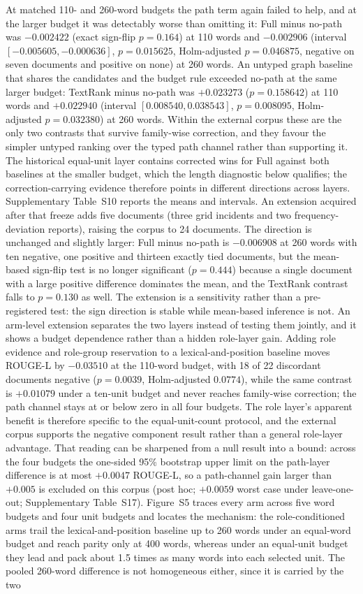 \documentclass[information,article,submit,moreauthors]{Definitions/mdpi}
\begin{document}
At matched 110- and 260-word budgets the path term again failed to help, and at the larger budget it was detectably worse than omitting it: Full minus no-path was $-0.002422$ (exact sign-flip $p=0.164$) at 110 words and $-0.002906$ (interval $[-0.005605,-0.000636]$, $p=0.015625$, Holm-adjusted $p=0.046875$, negative on seven documents and positive on none) at 260 words. An untyped graph baseline that shares the candidates and the budget rule exceeded no-path at the same larger budget: TextRank minus no-path was $+0.023273$ ($p=0.158642$) at 110 words and $+0.022940$ (interval $[0.008540,0.038543]$, $p=0.008095$, Holm-adjusted $p=0.032380$) at 260 words. Within the external corpus these are the only two contrasts that survive family-wise correction, and they favour the simpler untyped ranking over the typed path channel rather than supporting it. The historical equal-unit layer contains corrected wins for Full against both baselines at the smaller budget, which the length diagnostic below qualifies; the correction-carrying evidence therefore points in different directions across layers. Supplementary Table~S10 reports the means and intervals. An extension acquired after that freeze adds five documents (three grid incidents and two frequency-deviation reports), raising the corpus to 24 documents. The direction is unchanged and slightly larger: Full minus no-path is $-0.006908$ at 260 words with ten negative, one positive and thirteen exactly tied documents, but the mean-based sign-flip test is no longer significant ($p=0.444$) because a single document with a large positive difference dominates the mean, and the TextRank contrast falls to $p=0.130$ as well. The extension is a sensitivity rather than a pre-registered test: the sign direction is stable while mean-based inference is not. An arm-level extension separates the two layers instead of testing them jointly, and it shows a budget dependence rather than a hidden role-layer gain. Adding role evidence and role-group reservation to a lexical-and-position baseline moves ROUGE-L by $-0.03510$ at the 110-word budget, with 18 of 22 discordant documents negative ($p=0.0039$, Holm-adjusted $0.0774$), while the same contrast is $+0.01079$ under a ten-unit budget and never reaches family-wise correction; the path channel stays at or below zero in all four budgets. The role layer's apparent benefit is therefore specific to the equal-unit-count protocol, and the external corpus supports the negative component result rather than a general role-layer advantage. That reading can be sharpened from a null result into a bound: across the four budgets the one-sided 95\% bootstrap upper limit on the path-layer difference is at most $+0.0047$ ROUGE-L, so a path-channel gain larger than $+0.005$ is excluded on this corpus (post hoc; $+0.0059$ worst case under leave-one-out; Supplementary Table~S17). Figure~S5 traces every arm across five word budgets and four unit budgets and locates the mechanism: the role-conditioned arms trail the lexical-and-position baseline up to 260 words under an equal-word budget and reach parity only at 400 words, whereas under an equal-unit budget they lead and pack about 1.5 times as many words into each selected unit. The pooled 260-word difference is not homogeneous either, since it is carried by the two 
\end{document}
